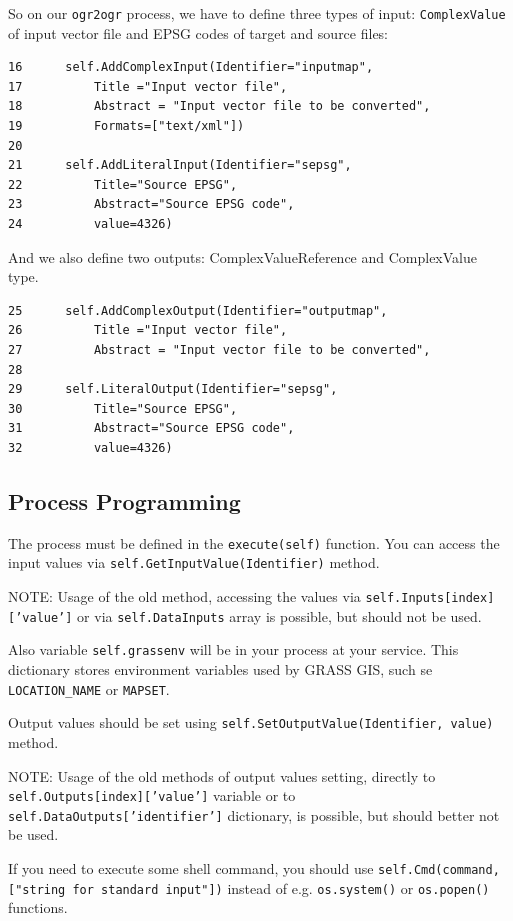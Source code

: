 \documentclass[a4paper,11pt]{article}
\newcommand{\note}[1]{\medskip{}\noindent{}NOTE: #1\medskip{}}
\begin{document}
\bigskip

So on our \texttt{ogr2ogr} process, we have to define three types of input:
\texttt{ComplexValue} of input vector file and EPSG codes of target and
source files:

\begin{verbatim}
16      self.AddComplexInput(Identifier="inputmap",
17          Title ="Input vector file",
18          Abstract = "Input vector file to be converted",
19          Formats=["text/xml"])
20
21      self.AddLiteralInput(Identifier="sepsg",
22          Title="Source EPSG",
23          Abstract="Source EPSG code",
24          value=4326) 
\end{verbatim}


And we also define two outputs: ComplexValueReference and ComplexValue
type.


\begin{verbatim}
25      self.AddComplexOutput(Identifier="outputmap",
26          Title ="Input vector file",
27          Abstract = "Input vector file to be converted",
28
29      self.LiteralOutput(Identifier="sepsg",
30          Title="Source EPSG",
31          Abstract="Source EPSG code",
32          value=4326) 
\end{verbatim}


\subsection{Process Programming}
    
The process must be defined in the \texttt{execute(self)} function. You can
access the input values via \texttt{self.GetInputValue(Identifier)} method.

\note{Usage of the old method, accessing the values via
\texttt{self.Inputs[index]['value']} or via \texttt{self.DataInputs} array
is possible, but should not be used.}

Also variable \texttt{self.grassenv} will be in your process at your
service. This dictionary stores environment variables used by GRASS GIS,
such se \texttt{LOCATION\_NAME} or \texttt{MAPSET}.

Output values should be set using \texttt{self.SetOutputValue(Identifier,
value)} method.

\note{Usage of the old methods of output values setting, directly to 
\texttt{self.Outputs[index]['value']} variable or to
\texttt{self.DataOutputs['identifier']} dictionary, is possible, but should
better not be used.}

If you need to execute some shell command, you should use
\texttt{self.Cmd(command,["string for standard input"])} instead of e.g.
\texttt{os.system()} or \texttt{os.popen()} functions.
\end{document}
